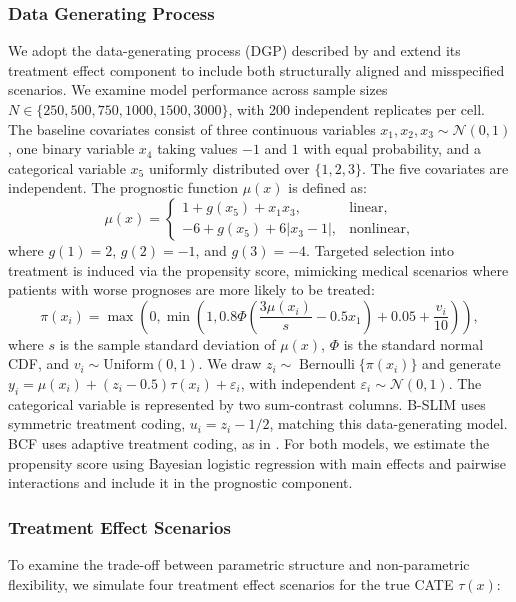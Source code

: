 \documentclass[12pt]{article}
\begin{document}
\subsubsection{Data Generating Process}
\label{subsec:simulation_dgp}
We adopt the data-generating process (DGP) described by \cite{hahn2020bayesian} and extend its treatment effect component to include both structurally aligned and misspecified scenarios. We examine model performance across sample sizes $N \in \{250, 500, 750, 1000, 1500, 3000\}$, with 200 independent replicates per cell. The baseline covariates consist of three continuous variables $x_1, x_2, x_3 \sim \mathcal{N}(0,1)$, one binary variable $x_4$ taking values $-1$ and $1$ with equal probability, and a categorical variable $x_5$ uniformly distributed over $\{1,2,3\}$. The five covariates are independent. The prognostic function $\mu(x)$ is defined as:
\[
\mu(x) =
\begin{cases}
    1 + g(x_5) + x_1 x_3, & \text{linear,} \\
    -6 + g(x_5) + 6|x_3 - 1|, & \text{nonlinear,}
\end{cases}
\]
where $g(1) = 2$, $g(2) = -1$, and $g(3) = -4$. Targeted selection into treatment is induced via the propensity score, mimicking medical scenarios where patients with worse prognoses are more likely to be treated:
\[
\pi(x_i) = \max\left(0, \min\left(1, 0.8\Phi\left(\frac{3\mu(x_i)}{s} - 0.5x_1\right) + 0.05 + \frac{v_i}{10}\right)\right),
\]
where $s$ is the sample standard deviation of $\mu(x)$, $\Phi$ is the standard normal CDF, and $v_i \sim \text{Uniform}(0, 1)$. We draw $z_i\sim\operatorname{Bernoulli}\{\pi(x_i)\}$ and generate $y_i=\mu(x_i)+(z_i-0.5)\tau(x_i)+\varepsilon_i$, with independent $\varepsilon_i\sim\mathcal{N}(0,1)$. The categorical variable is represented by two sum-contrast columns. B-SLIM uses symmetric treatment coding, $u_i=z_i-1/2$, matching this data-generating model. BCF uses adaptive treatment coding, as in \cite{hahn2020bayesian}. For both models, we estimate the propensity score using Bayesian logistic regression with main effects and pairwise interactions and include it in the prognostic component.

\subsubsection{Treatment Effect Scenarios}
\label{subsec:treatment_scenarios}
To examine the trade-off between parametric structure and non-parametric flexibility, we simulate four treatment effect scenarios for the true CATE $\tau(x)$:
\end{document}
